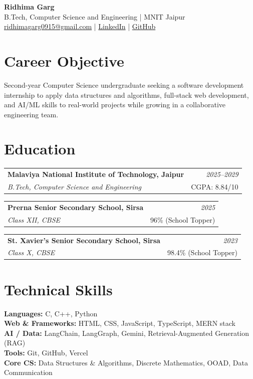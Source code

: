 \documentclass[10pt,a4paper]{article}
\makeatletter
\newcommand{\resumeSubheading}[4]{%
  \begin{tabularx}{\textwidth}{@{}X r@{}}
    \textbf{#1} & \textit{#2}\\
    \textit{#3} & #4
  \end{tabularx}\vspace{-2pt}
}
\makeatother
\begin{document}
\begin{center}
    {\LARGE\bfseries Ridhima Garg}\\[3pt]
    B.Tech, Computer Science and Engineering \;|\; MNIT Jaipur\\[3pt]
    \href{mailto:ridhimagarg0915@gmail.com}{ridhimagarg0915@gmail.com}
    \;|\;
    \href{https://linkedin.com/in/ridhima-garg-0a3725369}{LinkedIn}
    \;|\;
    \href{https://github.com/coderidhimagarg0915-pixel}{GitHub}
\end{center}

\section{Career Objective}
Second-year Computer Science undergraduate seeking a software development internship to apply data structures and algorithms, full-stack web development, and AI/ML skills to real-world projects while growing in a collaborative engineering team.

\section{Education}
\resumeSubheading
  {Malaviya National Institute of Technology, Jaipur}
  {2025--2029}
  {B.Tech, Computer Science and Engineering}
  {CGPA: 8.84/10}

\resumeSubheading
  {Prerna Senior Secondary School, Sirsa}
  {2025}
  {Class XII, CBSE}
  {96\% \; (School Topper)}

\resumeSubheading
  {St. Xavier's Senior Secondary School, Sirsa}
  {2023}
  {Class X, CBSE}
  {98.4\% \; (School Topper)}

\section{Technical Skills}
\textbf{Languages:} C, C++, Python\\
\textbf{Web \& Frameworks:} HTML, CSS, JavaScript, TypeScript, MERN stack\\
\textbf{AI / Data:} LangChain, LangGraph, Gemini, Retrieval-Augmented Generation (RAG)\\
\textbf{Tools:} Git, GitHub, Vercel\\
\textbf{Core CS:} Data Structures \& Algorithms, Discrete Mathematics, OOAD, Data Communication

\end{document}
